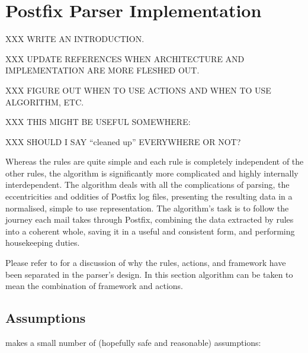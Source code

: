\newpage{}%

\section{Postfix Parser Implementation}
\label{Postfix Parser Implementation}

XXX WRITE AN INTRODUCTION\@.

XXX UPDATE REFERENCES WHEN ARCHITECTURE AND IMPLEMENTATION ARE MORE FLESHED
OUT\@.

XXX FIGURE OUT WHEN TO USE ACTIONS AND WHEN TO USE ALGORITHM, ETC\@.

XXX THIS MIGHT BE USEFUL SOMEWHERE\@:

XXX SHOULD I SAY ``cleaned up'' EVERYWHERE OR NOT\@?

Whereas the rules are quite simple and each rule is completely independent
of the other rules, the algorithm is significantly more complicated and
highly internally interdependent.  The algorithm deals with all the
complications of parsing, the eccentricities and oddities of Postfix log
files, presenting the resulting data in a normalised, simple to use
representation.  The algorithm's task is to follow the journey each mail
takes through Postfix, combining the data extracted by rules into a
coherent whole, saving it in a useful and consistent form, and performing
housekeeping duties.

Please refer to  for a discussion of why the
rules, actions, and framework have been separated in the parser's design.
In this section algorithm can be taken to mean the combination of framework
and actions.


\subsection{Assumptions}

\parsername{} makes a small number of (hopefully safe and reasonable)
assumptions:

